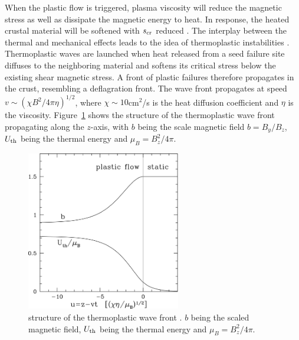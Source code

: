 When the plastic flow is triggered, plasma viscosity will reduce the magnetic stress as well as dissipate the magnetic energy to heat.
In response, the heated crustal material will be softened with $s_{\rm cr}$ reduced \citep{2010MNRAS.407L..54C}.
The interplay between the thermal and mechanical effects leads to the idea of thermoplastic instabilities \citep{2014ApJ...794L..24B}.
Thermoplastic waves are launched when heat released from a seed failure site diffuses to the neighboring material and softens its critical stress below the existing shear magnetic stress.
A front of plastic failures therefore propagates in the crust, resembling a deflagration front.
The wave front propagates at speed $v\sim (\chi B^2/4\pi\eta)^{1/2}$, where $\chi \sim 10$cm$^2$/s is the heat diffusion coefficient and $\eta$ is the viscosity.
Figure~\ref{fig:tpw} shows the structure of the thermoplastic wave front propagating along the $z$-axis, with $b$ being the scale magnetic field $b=B_y/B_z$, $U_{\rm th}$ being the thermal energy and $\mu_B=B_z^2/4\pi$.
%
\begin{figure}[h]
  \centering
  \includegraphics[width=0.6\textwidth]{pics/intro/tpw.jpg}
  \caption[Structure of the thermoplastic wave front]{structure of the thermoplastic wave front \citep{2014ApJ...794L..24B}.
  $b$ being the scaled magnetic field, $U_{\rm th}$ being the thermal energy and $\mu_B=B_z^2/4\pi$.}
  \label{fig:tpw}
\end{figure}
%

